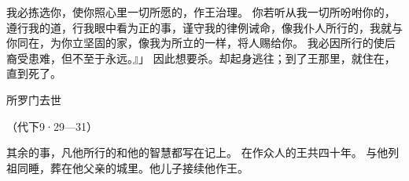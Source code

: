 {我必拣选你，使你照心里一切所愿的，作王治理{}。
你若听从我一切所吩咐你的，遵行我的道，行我眼中看为正的事，谨守我的律例诫命，像我仆人{}所行的，我就与你同在，为你立坚固的家，像我为{}所立的一样，将{}人赐给你。
我必因{}所行的使{}后裔受患难，但不至于永远。』」
因此想要杀{}。{}却起身逃往{}；到了{}王{}那里，就住在{}，直到{}死了。
\par }{\SH 所罗门去世
\par }{\R （代下9·29—31）
\par }{\PP {}其余的事，凡他所行的和他的智慧都写在{}记上。
在{}作{}众人的王共四十年。
与他列祖同睡，葬在他父亲{}的城里。他儿子{}接续他作王。

}
